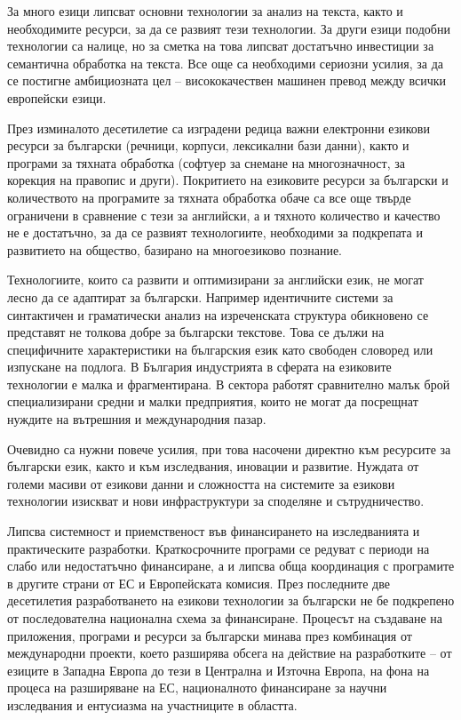 \begin{multicols}{2}
  За много езици липсват основни технологии за анализ на текста, както и
  необходимите ресурси, за да се развият тези технологии. За други езици
  подобни технологии са налице, но за сметка на това липсват достатъчно
  инвестиции за семантична обработка на текста. Все още са необходими
  сериозни усилия, за да се постигне амбициозната цел -- висококачествен
  машинен превод между всички европейски езици.

  През изминалото десетилетие са изградени редица важни електронни
  езикови ресурси за български (речници, корпуси, лексикални бази
  данни), както и програми за тяхната обработка (софтуер за снемане на
  многозначност, за корекция на правопис и други). Покритието на
  езиковите ресурси за български и количеството на програмите за тяхната
  обработка обаче са все още твърде ограничени в сравнение с тези за
  английски, а и тяхното количество и качество не е достатъчно, за да се
  развият технологиите, необходими за подкрепата и развитието на общество,
  базирано на многоезиково познание.

  Технологиите, които са развити и оптимизирани за английски език, не
  могат лесно да се адаптират за български. Например идентичните системи
  за синтактичен и граматически анализ на изреченската структура
  обикновено се представят не толкова добре за български текстове. Това
  се дължи на специфичните характеристики на българския език като
  свободен словоред или изпускане на подлога.  В България индустрията
  в сферата на езиковите технологии е малка и фрагментирана. В сектора
  работят сравнително малък брой специализирани средни и малки
  предприятия, които не могат да посрещнат нуждите на вътрешния и
  международния пазар.

  Очевидно са нужни повече усилия, при това насочени директно към
  ресурсите за български език, както и към изследвания, иновации и
  развитие.  Нуждата от големи масиви от езикови данни и сложността на
  системите за езикови технологии изискват и нови инфраструктури за
  споделяне и сътрудничество.

  Липсва системност и приемственост във финансирането на изследванията и
  практическите разработки. Краткосрочните програми се редуват с периоди
  на слабо или недостатъчно финансиране, а и липсва обща координация с
  програмите в другите страни от ЕС и Европейската комисия.  През
  последните две десетилетия разработването на езикови технологии за
  български не бе подкрепено от последователна национална схема за
  финансиране. Процесът на създаване на приложения, програми и
  ресурси за български минава през комбинация от международни проекти,
  което разширява обсега на действие на разработките – от езиците в
  Западна Европа до тези в Централна и Източна Европа, на фона на
  процеса на разширяване на ЕС, националното финансиране за научни
  изследвания и ентусиазма на участниците в областта.


\end{multicols}
